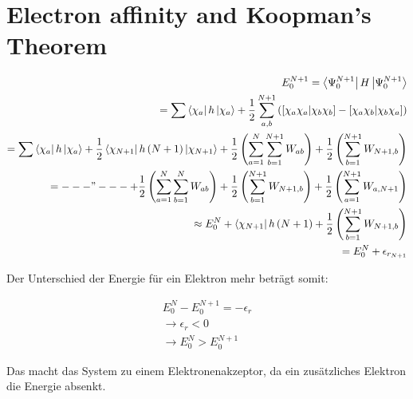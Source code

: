 \section{Electron affinity and Koopman’s Theorem}

\begin{align}
E_0^{N+1} = \Bra{\Psi_0^{N+1}} H \Ket{\Psi_0^{N+1}} \\
= \sum \Bra{\chi_a} h \Ket{\chi_a} + \frac{1}{2} \sum_{a,b}^{N+1} \left( \left[ \chi_a \chi_a | \chi_b \chi_b \right] - \left[ \chi_a \chi_b | \chi_b \chi_a \right] \right) \\
= \sum \Bra{\chi_a} h \Ket{\chi_a} + \frac{1}{2} \Bra{\chi_{N+1}} h \left( N+1 \right) \Ket{\chi_{N+1}} + \frac{1}{2} \left( \sum_{a=1}^N \sum_{b=1}^{N+1} W_{ab} \right) + \frac{1}{2} \left( \sum_{b=1}^{N+1} W_{N+1,b} \right) \\
= ---"--- + \frac{1}{2} \left( \sum_{a=1}^N \sum_{b=1}^{N} W_{ab} \right) + \frac{1}{2} \left( \sum_{b=1}^{N+1} W_{N+1,b} \right) + \frac{1}{2} \left( \sum_{a=1}^{N+1} W_{a,N+1} \right) \\
\approx E_0^N +  \Bra{\chi_{N+1}} h \left( N+1 \right) + \frac{1}{2} \left( \sum_{b=1}^{N+1} W_{N+1,b} \right) \\
= E_0^N + \epsilon_{r_{N+1}}
\end{align}

Der Unterschied der Energie f\"ur ein Elektron mehr betr\"agt somit:

\begin{align}
E_0^N - E_0^{N+1} = - \epsilon_r \\
\rightarrow \epsilon_r < 0 \\
\rightarrow E_0^N > E_0^{N+1}
\end{align}

Das macht das System zu einem Elektronenakzeptor, da ein zus\"atzliches Elektron die Energie absenkt.